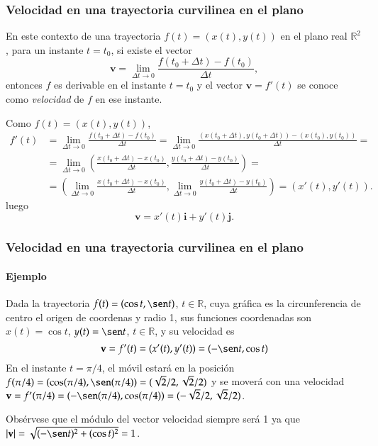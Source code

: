 \begin{frame}
\frametitle{Velocidad en una trayectoria curvilinea en el plano}
En este contexto de una trayectoria $f(t)=(x(t),y(t))$ en el plano real $\mathbb{R}^2$, para un instante $t=t_0$, si existe el vector
\[
\mathbf{v} = \lim_{\Delta t\rightarrow 0} \frac{f(t_0+\Delta t)-f(t_0)}{\Delta t},
\] 
entonces $f$ es derivable en el instante $t=t_0$ y el vector $\mathbf{v}=f'(t)$ se conoce como \emph{velocidad} de $f$ en ese instante.

Como $f(t)=(x(t),y(t))$, 
\begin{align*}
f'(t)&=\lim_{\Delta t\rightarrow 0} \frac{f(t_0+\Delta t)-f(t_0)}{\Delta t} = \lim_{\Delta t\rightarrow 0} \frac{(x(t_0+\Delta t),y(t_0+\Delta t))-(x(t_0),y(t_0))}{\Delta t} =\\
&=  \lim_{\Delta t\rightarrow 0} \left(\frac{x(t_0+\Delta t)-x(t_0)}{\Delta t},\frac{y(t_0+\Delta t)-y(t_0)}{\Delta t}\right) =\\
&= \left(\lim_{\Delta t\rightarrow 0}\frac{x(t_0+\Delta t)-x(t_0)}{\Delta t},\lim_{\Delta t\rightarrow 0}\frac{y(t_0+\Delta t)-y(t_0)}{\Delta t}\right) = 
(x'(t),y'(t)). 
\end{align*} 
luego
\[
\mathbf{v} = x'(t)\mathbf{i}+y'(t)\mathbf{j}.
\]
\end{frame}


\begin{frame}
\frametitle{Velocidad en una trayectoria curvilinea en el plano}
\framesubtitle{Ejemplo}
Dada la trayectoria $f(t) = (\cos t,\sen t)$, $t\in \mathbb{R}$, cuya gráfica es la circunferencia de centro el origen
de coordenas y radio 1, sus funciones coordenadas son $x(t) = \cos t$, $y(t) = \sen t$, $t\in \mathbb{R}$, y su velocidad es 
\[
\mathbf{v}=f'(t)=(x'(t),y'(t))=(-\sen t, \cos t)
\]
En el instante $t=\pi/4$, el móvil estará en la posición $f(\pi/4) = (\cos(\pi/4),\sen(\pi/4)) =(\sqrt{2}/2,\sqrt{2}/2)$
y se moverá con una velocidad $\mathbf{v}=f'(\pi/4)=(-\sen(\pi/4),\cos(\pi/4))=(-\sqrt{2}/2,\sqrt{2}/2)$.
\begin{center}
\scalebox{0.8}{}
\end{center}  
Obsérvese que el módulo del vector velocidad siempre será 1 ya que 
$|\mathbf{v}|=\sqrt{(-\sen t)^2+(\cos t)^2}=1$.
\end{frame}



